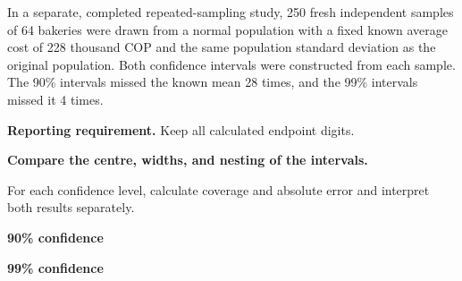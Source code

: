 In a separate, completed repeated-sampling study, 250 fresh independent samples of 64 bakeries were drawn from a normal population with a fixed known average cost of 228 thousand COP and the same population standard deviation as the original population. Both confidence intervals were constructed from each sample. The 90\% intervals missed the known mean 28 times, and the 99\% intervals missed it 4 times.

\textbf{Reporting requirement.} Keep all calculated endpoint digits.


\BlankInformationTable

\clearpage
{}

\clearpage
{}
\textbf{Compare the centre, widths, and nesting of the intervals.}
\workspace{.65in}


For each confidence level, calculate coverage and absolute error and interpret both results separately.
\par\textbf{90\% confidence}\workspace{.65in}
\par\textbf{99\% confidence}\workspace{.65in}
\workspace{.4in}
\vfill


